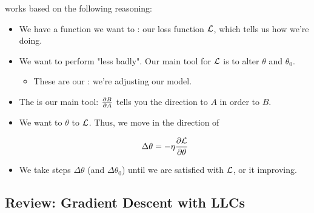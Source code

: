         \begin{concept}
             works based on the following reasoning:
        
            \begin{itemize}
                \item We have a function we want to : our loss function $\mathcal{L}$, which tells us how  we're doing.
                    
                \item We want to perform "less badly". Our main tool for  $\mathcal{L}$ is to alter $\theta$ and $\theta_0$.
                    \begin{itemize}
                        \item These are our : we're adjusting our model.
                    \end{itemize}

                    
                \phantom{}
                
                    
                \item The  is our main tool: $\frac{\partial B}{\partial A}$ tells you the direction to  $A$ in order to  $B$.
                
                \item We want to  $\theta$ to  $\mathcal{L}$. Thus, we move in the direction of 
                    
                    \begin{equation*}
                        \Delta \theta = -\eta \frac{\partial \mathcal{L}}{\partial \theta}
                    \end{equation*}
                    
                \item We take steps $\Delta \theta$ (and $\Delta \theta_0$) until we are satisfied with $\mathcal{L}$, or it  improving.
            \end{itemize}
            
        \end{concept}

        
    \phantom{}  
        
    \subsection{Review: Gradient Descent with LLCs}
    
